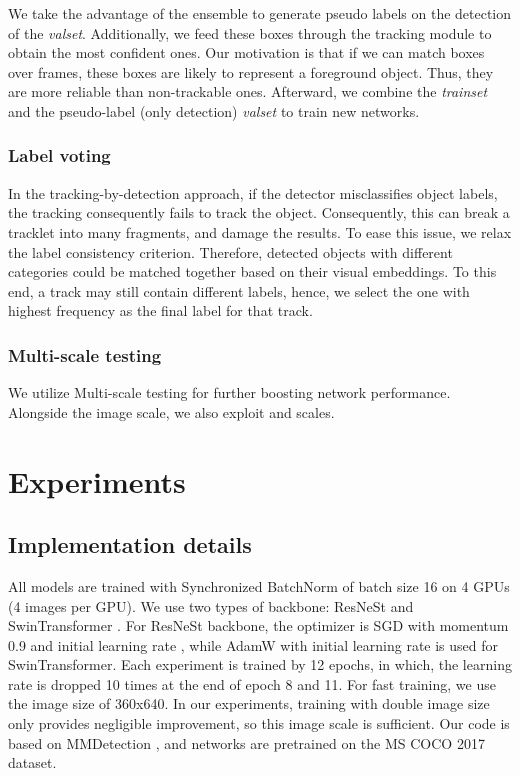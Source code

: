 \documentclass[10pt,twocolumn,letterpaper]{article}
\begin{document}
We take the advantage of the ensemble to generate pseudo labels on the detection of the \textit{valset}. Additionally, we feed these boxes through the tracking module to obtain the most confident ones. Our motivation is that if we can match boxes over frames, these boxes are likely to represent a foreground object. Thus, they are more reliable than non-trackable ones. Afterward, we combine the \textit{trainset} and the pseudo-label (only detection) \textit{valset} to train new networks.

 \subsubsection{Label voting}
\label{sec:label-voting}

In the tracking-by-detection approach, if the detector misclassifies object labels, the tracking consequently fails to track the object. Consequently, this can break a tracklet into many fragments, and damage the results. To ease this issue, we relax the label consistency criterion. Therefore, detected objects with different categories could be matched together based on their visual embeddings. To this end, a track may still contain different labels, hence, we select the one with highest frequency as the final label for that track.
 \subsubsection{Multi-scale testing}
\label{sec:multi-scale-testing}

We utilize Multi-scale testing for further boosting network performance. Alongside the  image scale, we also exploit  and  scales.
 


\section{Experiments}
\label{sec:experiments}

\subsection{Implementation details}
\label{sec:implementation}

All models are trained with Synchronized BatchNorm of batch size 16 on 4 GPUs (4 images per GPU). We use two types of backbone: ResNeSt \cite{resnest} and SwinTransformer \cite{swin}. For ResNeSt backbone, the optimizer is SGD with momentum 0.9 and initial learning rate , while AdamW \cite{adamw} with initial learning rate  is used for SwinTransformer. Each experiment is trained by 12 epochs, in which, the learning rate is dropped 10 times at the end of epoch 8 and 11. For fast training, we use the image size of 360x640. In our experiments, training with double image size only provides negligible improvement, so this image scale is sufficient. Our code is based on MMDetection \cite{mmdetection}, and networks are pretrained on the MS COCO 2017 dataset.
\end{document}

